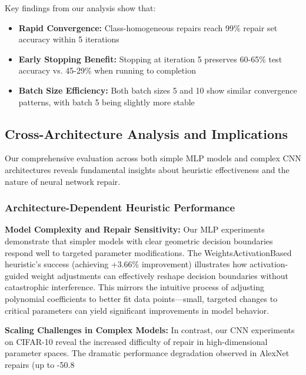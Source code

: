\documentclass{article}
\begin{document}
Key findings from our analysis show that:
\begin{itemize}
	\item \textbf{Rapid Convergence:} Class-homogeneous repairs reach 99\% repair set accuracy within 5 iterations
	\item \textbf{Early Stopping Benefit:} Stopping at iteration 5 preserves 60-65\% test accuracy vs. 45-29\% when running to completion
	\item \textbf{Batch Size Efficiency:} Both batch sizes 5 and 10 show similar convergence patterns, with batch 5 being slightly more stable
\end{itemize}

\subsection{Cross-Architecture Analysis and Implications}

Our comprehensive evaluation across both simple MLP models and complex CNN architectures reveals fundamental insights about heuristic effectiveness and the nature of neural network repair.

\subsubsection{Architecture-Dependent Heuristic Performance}

\textbf{Model Complexity and Repair Sensitivity:} Our MLP experiments demonstrate that simpler models with clear geometric decision boundaries respond well to targeted parameter modifications. The WeightsActivationBased heuristic's success (achieving +3.66\% improvement) illustrates how activation-guided weight adjustments can effectively reshape decision boundaries without catastrophic interference. This mirrors the intuitive process of adjusting polynomial coefficients to better fit data points—small, targeted changes to critical parameters can yield significant improvements in model behavior.

\textbf{Scaling Challenges in Complex Models:} In contrast, our CNN experiments on CIFAR-10 reveal the increased difficulty of repair in high-dimensional parameter spaces. The dramatic performance degradation observed in AlexNet repairs (up to -50.8%
\end{document}

